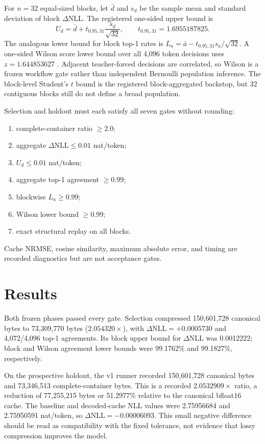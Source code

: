 \documentclass[10pt,twocolumn]{article}
\newcommand{\dNLL}{\Delta\mathrm{NLL}}
\begin{document}
For $n=32$ equal-sized blocks, let $\bar d$ and $s_d$ be the sample mean and
standard deviation of block $\dNLL$. The registered one-sided upper bound is
\begin{equation}
  U_d=\bar d+t_{0.95,31}\frac{s_d}{\sqrt{32}},
  \qquad t_{0.95,31}=1.6955187825.
\end{equation}
The analogous lower bound for block top-1 rates is
$L_a=\bar a-t_{0.95,31}s_a/\sqrt{32}$. A one-sided Wilson score lower bound
over all 4,096 token decisions uses $z=1.644853627$
\cite{student1908,wilson1927}. Adjacent teacher-forced decisions are
correlated, so Wilson is a frozen workflow gate rather than independent
Bernoulli population inference. The block-level Student's $t$ bound is the
registered block-aggregated backstop, but 32 contiguous blocks still do not
define a broad population.

Selection and holdout must each satisfy all seven gates without rounding:
\begin{enumerate}[leftmargin=1.3em,itemsep=1pt,topsep=2pt]
  \item complete-container ratio $\geq2.0$;
  \item aggregate $\dNLL\leq0.01$ nat/token;
  \item $U_d\leq0.01$ nat/token;
  \item aggregate top-1 agreement $\geq0.99$;
  \item blockwise $L_a\geq0.99$;
  \item Wilson lower bound $\geq0.99$;
  \item exact structural replay on all blocks.
\end{enumerate}
Cache NRMSE, cosine similarity, maximum absolute error, and timing are recorded
diagnostics but are not acceptance gates.

\section{Results}
\label{sec:results}



Both frozen phases passed every gate. Selection compressed 150,601,728
canonical bytes to 73,309,770 bytes ($2.054320\times$), with
$\dNLL=+0.0005730$ and 4,072/4,096 top-1 agreements. Its block upper bound for
$\dNLL$ was 0.0012222; block and Wilson agreement lower bounds were 99.1762\%
and 99.1827\%, respectively.

On the prospective holdout, the v1 runner recorded 150,601,728 canonical bytes
and 73,346,513 complete-container bytes. This is a recorded
$2.0532909\times$ ratio, a reduction of 77,255,215 bytes or 51.2977\% relative
to the canonical bfloat16 cache. The
baseline and decoded-cache NLL values were 2.75956684 and 2.75950591
nat/token, so $\dNLL=-0.00006093$. This small negative difference should be
read as compatibility with the fixed tolerance, not evidence that lossy
compression improves the model.
\end{document}
